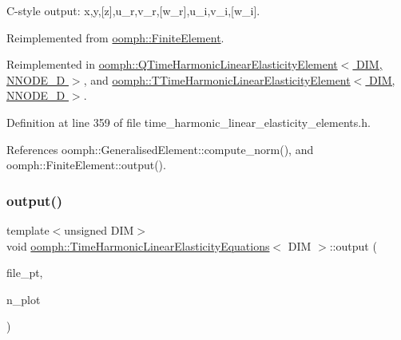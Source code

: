 C-\/style output\+: x,y,\mbox{[}z\mbox{]},u\+\_\+r,v\+\_\+r,\mbox{[}w\+\_\+r\mbox{]},u\+\_\+i,v\+\_\+i,\mbox{[}w\+\_\+i\mbox{]}. 



Reimplemented from \hyperlink{classoomph_1_1FiniteElement_a72cddd09f8ddbee1a20a1ff404c6943e}{oomph\+::\+Finite\+Element}.



Reimplemented in \hyperlink{classoomph_1_1QTimeHarmonicLinearElasticityElement_a1a8ff0960bcfd07a8c24ca74309f6594}{oomph\+::\+Q\+Time\+Harmonic\+Linear\+Elasticity\+Element$<$ D\+I\+M, N\+N\+O\+D\+E\+\_\+D $>$}, and \hyperlink{classoomph_1_1TTimeHarmonicLinearElasticityElement_ac0124efd664afd05141495c072587d6a}{oomph\+::\+T\+Time\+Harmonic\+Linear\+Elasticity\+Element$<$ D\+I\+M, N\+N\+O\+D\+E\+\_\+D $>$}.



Definition at line 359 of file time\+\_\+harmonic\+\_\+linear\+\_\+elasticity\+\_\+elements.\+h.



References oomph\+::\+Generalised\+Element\+::compute\+\_\+norm(), and oomph\+::\+Finite\+Element\+::output().

\mbox{\label{classoomph_1_1TimeHarmonicLinearElasticityEquations_a1913ef957b846a4bf04991718b83f9b5}} 
\subsubsection{\texorpdfstring{output()}{output()}\hspace{0.1cm}{\footnotesize\ttfamily [4/4]}}
{\footnotesize\ttfamily template$<$unsigned D\+IM$>$ \\
void \hyperlink{classoomph_1_1TimeHarmonicLinearElasticityEquations}{oomph\+::\+Time\+Harmonic\+Linear\+Elasticity\+Equations}$<$ D\+IM $>$\+::output (\begin{DoxyParamCaption}\item[{F\+I\+LE $\ast$}]{file\+\_\+pt,  }\item[{const unsigned \&}]{n\+\_\+plot }\end{DoxyParamCaption})\hspace{0.3cm}{\ttfamily [virtual]}}



